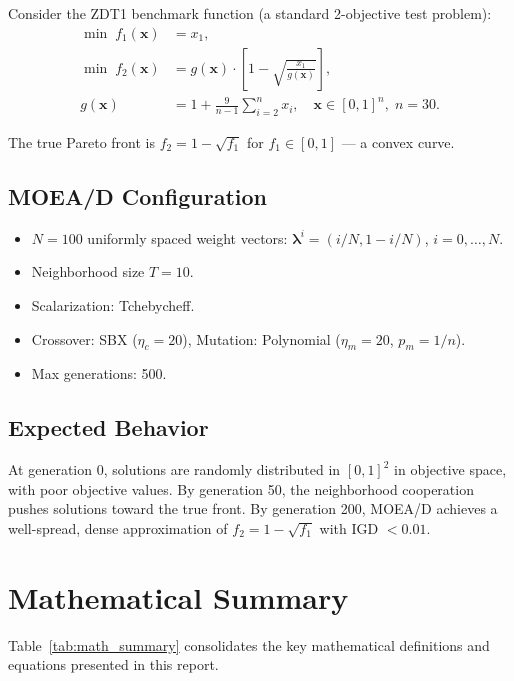 \documentclass[12pt,a4paper]{article}
\begin{document}
Consider the ZDT1 benchmark function (a standard 2-objective test problem):
\begin{align}
    \min\; f_1(\mathbf{x}) &= x_1, \\
    \min\; f_2(\mathbf{x}) &= g(\mathbf{x}) \cdot \left[1 - \sqrt{\frac{x_1}{g(\mathbf{x})}}\right], \\
    g(\mathbf{x}) &= 1 + \frac{9}{n-1}\sum_{i=2}^{n} x_i, \quad
    \mathbf{x} \in [0,1]^n, \; n = 30.
\end{align}

The true Pareto front is $f_2 = 1 - \sqrt{f_1}$ for $f_1 \in [0,1]$ --- a convex curve.

\subsection{MOEA/D Configuration}

\begin{itemize}[leftmargin=1.5cm]
    \item $N = 100$ uniformly spaced weight vectors: $\boldsymbol{\lambda}^i = (i/N, 1 - i/N)$, $i = 0, \ldots, N$.
    \item Neighborhood size $T = 10$.
    \item Scalarization: Tchebycheff.
    \item Crossover: SBX ($\eta_c = 20$), Mutation: Polynomial ($\eta_m = 20$, $p_m = 1/n$).
    \item Max generations: 500.
\end{itemize}

\subsection{Expected Behavior}

At generation 0, solutions are randomly distributed in $[0,1]^2$ in objective space, with poor objective values. By generation 50, the neighborhood cooperation pushes solutions toward the true front. By generation 200, MOEA/D achieves a well-spread, dense approximation of $f_2 = 1 - \sqrt{f_1}$ with IGD $< 0.01$.

\section{Mathematical Summary}
\label{sec:math_summary}

Table~\ref{tab:math_summary} consolidates the key mathematical definitions and equations presented in this report.
\end{document}
